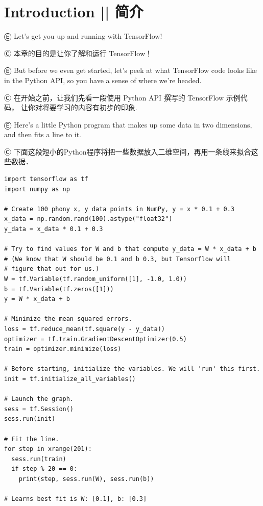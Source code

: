 

\section{Introduction  ||  简介}

Ⓔ \textcolor{etc}{Let's get you up and running with TensorFlow!}

Ⓒ 本章的目的是让你了解和运行 TensorFlow！

Ⓔ \textcolor{etc}{But before we even get started, let's peek at what TensorFlow code looks like in the Python API, so you have a sense of where we're headed.}

Ⓒ 在开始之前，让我们先看一段使用 Python API 撰写的 TensorFlow 示例代码，
让你对将要学习的内容有初步的印象.

Ⓔ \textcolor{etc}{Here's a little Python program that makes up some data in two dimensions, and then fits a line to it.}

Ⓒ 下面这段短小的Python程序将把一些数据放入二维空间，再用一条线来拟合这些数据．

\begin{lstlisting}
import tensorflow as tf
import numpy as np

# Create 100 phony x, y data points in NumPy, y = x * 0.1 + 0.3
x_data = np.random.rand(100).astype("float32")
y_data = x_data * 0.1 + 0.3

# Try to find values for W and b that compute y_data = W * x_data + b
# (We know that W should be 0.1 and b 0.3, but Tensorflow will
# figure that out for us.)
W = tf.Variable(tf.random_uniform([1], -1.0, 1.0))
b = tf.Variable(tf.zeros([1]))
y = W * x_data + b

# Minimize the mean squared errors.
loss = tf.reduce_mean(tf.square(y - y_data))
optimizer = tf.train.GradientDescentOptimizer(0.5)
train = optimizer.minimize(loss)

# Before starting, initialize the variables. We will 'run' this first.
init = tf.initialize_all_variables()

# Launch the graph.
sess = tf.Session()
sess.run(init)

# Fit the line.
for step in xrange(201):
  sess.run(train)
  if step % 20 == 0:
    print(step, sess.run(W), sess.run(b))

# Learns best fit is W: [0.1], b: [0.3]
\end{lstlisting}

